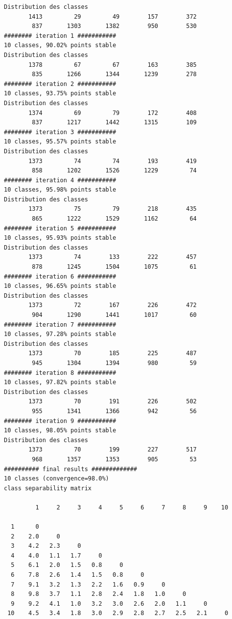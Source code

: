 \documentclass[land,article,submit,pdftex,moreauthors]{Definitions/mdpi}
\begin{document}
\begin{scriptsize}
\begin{verbatim}
Distribution des classes
       1413         29         49        157        372
        837       1303       1382        950        530
######## iteration 1 ###########
10 classes, 90.02% points stable
Distribution des classes
       1378         67         67        163        385
        835       1266       1344       1239        278
######## iteration 2 ###########
10 classes, 93.75% points stable
Distribution des classes
       1374         69         79        172        408
        837       1217       1442       1315        109
######## iteration 3 ###########
10 classes, 95.57% points stable
Distribution des classes
       1373         74         74        193        419
        858       1202       1526       1229         74
######## iteration 4 ###########
10 classes, 95.98% points stable
Distribution des classes
       1373         75         79        218        435
        865       1222       1529       1162         64
######## iteration 5 ###########
10 classes, 95.93% points stable
Distribution des classes
       1373         74        133        222        457
        878       1245       1504       1075         61
######## iteration 6 ###########
10 classes, 96.65% points stable
Distribution des classes
       1373         72        167        226        472
        904       1290       1441       1017         60
######## iteration 7 ###########
10 classes, 97.28% points stable
Distribution des classes
       1373         70        185        225        487
        945       1304       1394        980         59
######## iteration 8 ###########
10 classes, 97.82% points stable
Distribution des classes
       1373         70        191        226        502
        955       1341       1366        942         56
######## iteration 9 ###########
10 classes, 98.05% points stable
Distribution des classes
       1373         70        199        227        517
        968       1357       1353        905         53
########## final results #############
10 classes (convergence=98.0%)
class separability matrix

         1     2     3     4     5     6     7     8     9    10

  1      0
  2    2.0     0
  3    4.2   2.3     0
  4    4.0   1.1   1.7     0
  5    6.1   2.0   1.5   0.8     0
  6    7.8   2.6   1.4   1.5   0.8     0
  7    9.1   3.2   1.3   2.2   1.6   0.9     0
  8    9.8   3.7   1.1   2.8   2.4   1.8   1.0     0
  9    9.2   4.1   1.0   3.2   3.0   2.6   2.0   1.1     0
 10    4.5   3.4   1.8   3.0   2.9   2.8   2.7   2.5   2.1     0


\end{verbatim}
\end{scriptsize}
\end{document}
